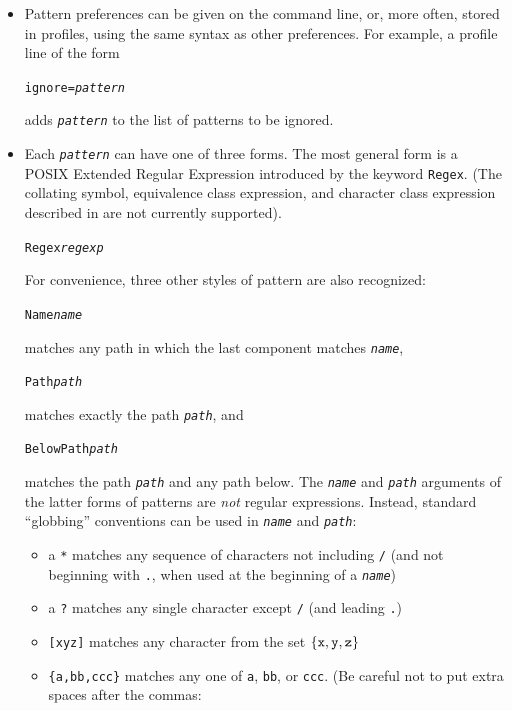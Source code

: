 \documentclass{article}
\newcommand{\ARG}[1]{\texttt{\textit{#1}}}
\begin{document}
\begin{itemize}
\item Pattern preferences can be given on the command line,
  or, more often, stored in profiles, using the same syntax as other preferences.
  For example, a profile line of the form
\begin{alltt}
             ignore = \ARG{pattern}
\end{alltt}
adds \ARG{pattern} to the list of patterns to be ignored.

\item Each \ARG{pattern} can have one of three forms.  The most
general form is a POSIX Extended Regular Expression introduced by the
keyword \verb|Regex|. (The collating symbol, equivalence class
expression, and character class expression described in 
are not currently supported).
\begin{alltt}
                 Regex \ARG{regexp}
\end{alltt}
For convenience, three other styles of pattern are also recognized:
\begin{alltt}
                 Name \ARG{name}
\end{alltt}
matches any path in which the last component matches \ARG{name},
\begin{alltt}
                 Path \ARG{path}
\end{alltt}
matches exactly the path \ARG{path}, and
\begin{alltt}
                 BelowPath \ARG{path}
\end{alltt}
matches the path \ARG{path} and any path below.
%
The \ARG{name} and \ARG{path} arguments of the latter forms of
patterns are {\em not} regular expressions.  Instead,
standard ``globbing'' conventions can be used in \ARG{name} and
\ARG{path}:
\begin{itemize}
\item a \verb|*| matches any sequence of characters not including \verb|/|
(and not beginning with \verb|.|, when used at the beginning of a
\ARG{name})
\item a \verb|?| matches any single character except \verb|/| (and leading
  \verb|.|)
\item \verb|[xyz]| matches any character from the set $\{{\tt x},
  {\tt y}, {\tt z} \}$
\item \verb|{a,bb,ccc}| matches any one of \verb|a|, \verb|bb|, or
  \verb|ccc|.  (Be careful not to put extra spaces after the commas:

\end{itemize}
\end{itemize}
\end{document}
